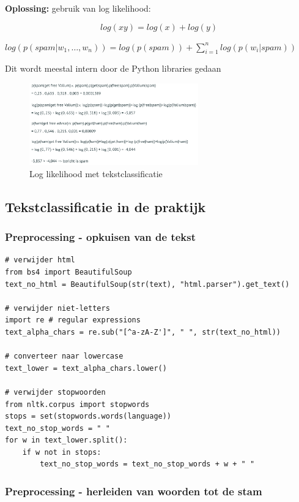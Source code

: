\documentclass{article}
\begin{document}
\textbf{Oplossing:} gebruik van log likelihood:

\begin{equation}
    log(xy) = log(x) + log(y)
\end{equation}

$log(p(spam | w_1, \dots, w_n)) = log(p(spam)) + \sum_{i=1}^n log(p(w_i | spam))$

Dit wordt meestal intern door de Python libraries gedaan

\begin{figure}[H]
    \centering
    \includegraphics[width=0.65\textwidth]{log-likelihood.png}
    \caption{Log likelihood met tekstclassificatie}
\end{figure}


\subsection{Tekstclassificatie in de praktijk}

\subsubsection{Preprocessing - opkuisen van de tekst}

\begin{verbatim}
# verwijder html
from bs4 import BeautifulSoup
text_no_html = BeautifulSoup(str(text), "html.parser").get_text()

# verwijder niet-letters
import re # regular expressions
text_alpha_chars = re.sub("[^a-zA-Z']", " ", str(text_no_html))

# converteer naar lowercase
text_lower = text_alpha_chars.lower()

# verwijder stopwoorden
from nltk.corpus import stopwords
stops = set(stopwords.words(language))
text_no_stop_words = " "
for w in text_lower.split():
    if w not in stops:
        text_no_stop_words = text_no_stop_words + w + " "
\end{verbatim}

\subsubsection{Preprocessing - herleiden van woorden tot de stam}
\end{document}

